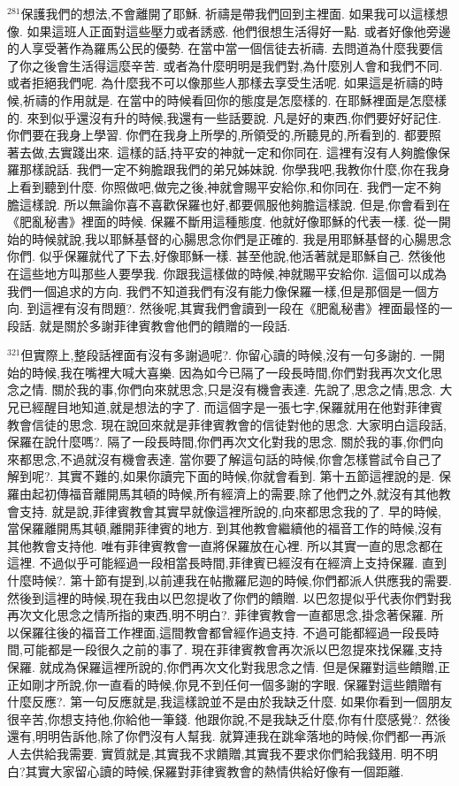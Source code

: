 \documentclass{book}
\begin{document}
$^{281}$保護我們的想法,不會離開了耶穌.
祈禱是帶我們回到主裡面.
如果我可以這樣想像.
如果這班人正面對這些壓力或者誘惑.
他們很想生活得好一點.
或者好像他旁邊的人享受著作為羅馬公民的優勢.
在當中當一個信徒去祈禱.
去問道為什麼我要信了你之後會生活得這麼辛苦.
或者為什麼明明是我們對,為什麼別人會和我們不同.
或者拒絕我們呢.
為什麼我不可以像那些人那樣去享受生活呢.
如果這是祈禱的時候,祈禱的作用就是.
在當中的時候看回你的態度是怎麼樣的.
在耶穌裡面是怎麼樣的.
來到似乎還沒有升的時候,我還有一些話要說.
凡是好的東西,你們要好好記住.
你們要在我身上學習.
你們在我身上所學的,所領受的,所聽見的,所看到的.
都要照著去做,去實踐出來.
這樣的話,持平安的神就一定和你同在.
這裡有沒有人夠膽像保羅那樣說話.
我們一定不夠膽跟我們的弟兄姊妹說.
你學我吧,我教你什麼,你在我身上看到聽到什麼.
你照做吧,做完之後,神就會賜平安給你,和你同在.
我們一定不夠膽這樣說.
所以無論你喜不喜歡保羅也好,都要佩服他夠膽這樣說.
但是,你會看到在《肥亂秘書》裡面的時候.
保羅不斷用這種態度.
他就好像耶穌的代表一樣.
從一開始的時候就說,我以耶穌基督的心腸思念你們是正確的.
我是用耶穌基督的心腸思念你們.
似乎保羅就代了下去,好像耶穌一樣.
甚至他說,他活著就是耶穌自己.
然後他在這些地方叫那些人要學我.
你跟我這樣做的時候,神就賜平安給你.
這個可以成為我們一個追求的方向.
我們不知道我們有沒有能力像保羅一樣,但是那個是一個方向.
到這裡有沒有問題?.
然後呢,其實我們會讀到一段在《肥亂秘書》裡面最怪的一段話.
就是關於多謝菲律賓教會他們的饋贈的一段話.

$^{321}$但實際上,整段話裡面有沒有多謝過呢?.
你留心讀的時候,沒有一句多謝的.
一開始的時候,我在嘴裡大喊大喜樂.
因為如今已隔了一段長時間,你們對我再次文化思念之情.
關於我的事,你們向來就思念,只是沒有機會表達.
先說了,思念之情,思念.
大兄已經醒目地知道,就是想法的字了.
而這個字是一張七字,保羅就用在他對菲律賓教會信徒的思念.
現在說回來就是菲律賓教會的信徒對他的思念.
大家明白這段話,保羅在說什麼嗎?.
隔了一段長時間,你們再次文化對我的思念.
關於我的事,你們向來都思念,不過就沒有機會表達.
當你要了解這句話的時候,你會怎樣嘗試令自己了解到呢?.
其實不難的,如果你讀完下面的時候,你就會看到.
第十五節這裡說的是.
保羅由起初傳福音離開馬其頓的時候,所有經濟上的需要,除了他們之外,就沒有其他教會支持.
就是說,菲律賓教會其實早就像這裡所說的,向來都思念我的了.
早的時候,當保羅離開馬其頓,離開菲律賓的地方.
到其他教會繼續他的福音工作的時候,沒有其他教會支持他.
唯有菲律賓教會一直將保羅放在心裡.
所以其實一直的思念都在這裡.
不過似乎可能經過一段相當長時間,菲律賓已經沒有在經濟上支持保羅.
直到什麼時候?.
第十節有提到,以前連我在帖撒羅尼迦的時候,你們都派人供應我的需要.
然後到這裡的時候,現在我由以巴忽提收了你們的饋贈.
以巴忽提似乎代表你們對我再次文化思念之情所指的東西,明不明白?.
菲律賓教會一直都思念,掛念著保羅.
所以保羅往後的福音工作裡面,這間教會都曾經作過支持.
不過可能都經過一段長時間,可能都是一段很久之前的事了.
現在菲律賓教會再次派以巴忽提來找保羅,支持保羅.
就成為保羅這裡所說的,你們再次文化對我思念之情.
但是保羅對這些饋贈,正正如剛才所說,你一直看的時候,你見不到任何一個多謝的字眼.
保羅對這些饋贈有什麼反應?.
第一句反應就是,我這樣說並不是由於我缺乏什麼.
如果你看到一個朋友很辛苦,你想支持他,你給他一筆錢.
他跟你說,不是我缺乏什麼,你有什麼感覺?.
然後還有,明明告訴他,除了你們沒有人幫我.
就算連我在跳傘落地的時候,你們都一再派人去供給我需要.
實質就是,其實我不求饋贈,其實我不要求你們給我錢用.
明不明白?其實大家留心讀的時候,保羅對菲律賓教會的熱情供給好像有一個距離.
\end{document}
